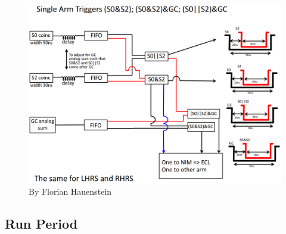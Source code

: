 \documentclass{beamer}
\begin{document}
\begin{frame}
\vspace{-8pt}
\begin{figure}
	\includegraphics[width=12cm]{../images/trigger_1}
	\caption{By Florian Hauenstein}
\end{figure}
\end{frame}




\subsection{Run Period}
\end{document}
